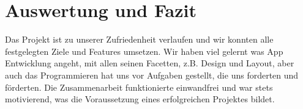 
\section{Auswertung und Fazit}  %
Das Projekt ist zu unserer Zufriedenheit verlaufen und wir konnten alle festgelegten
Ziele und Features umsetzen. Wir haben viel gelernt was App Entwicklung angeht, mit
allen seinen Facetten, z.B. Design und Layout, aber auch das Programmieren hat uns
vor Aufgaben gestellt, die uns forderten und förderten.
Die Zusammenarbeit funktionierte einwandfrei
und war stets motivierend, was die Voraussetzung eines erfolgreichen Projektes bildet.

\appendix
\printbibliography[heading=bibintoc,title={Quellenverzeichnis}]
\clearpage
\listoffigures


